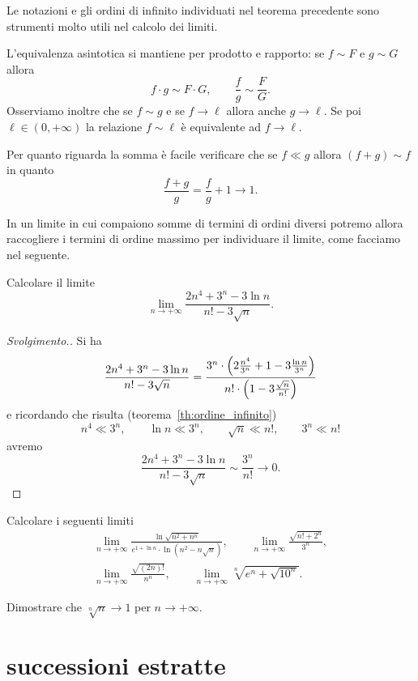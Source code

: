 Le notazioni e gli
ordini di infinito individuati nel teorema precedente
sono strumenti molto utili nel calcolo dei limiti.

L'equivalenza asintotica
si mantiene per prodotto e rapporto:
se $f\sim F$ e $g\sim G$ allora
\[
 f \cdot g \sim F \cdot G,
 \qquad
 \frac{f}{g} \sim \frac{F}{G}.
\]
Osserviamo inoltre che se
$f \sim g$ e se $f\to \ell$ allora
anche $g\to \ell$.
Se poi $\ell\in(0,+\infty)$
la relazione $f\sim \ell$ è equivalente ad $f\to \ell$.

Per quanto riguarda la somma
è facile verificare che se $f\ll g$ allora
$(f+g) \sim f$ in quanto
\[
  \frac{f + g}{g} = \frac{f}{g} + 1 \to 1.
\]

In un limite in cui compaiono somme di termini
di ordini diversi potremo allora raccogliere i termini di ordine
massimo per individuare il limite, come facciamo
nel seguente.

\begin{example}
Calcolare il limite
\[
\lim_{n\to+\infty}
\frac{2n^4 + 3^n - 3 \ln n}{n! - 3\sqrt n}.
\]
\end{example}
\begin{proof}[Svolgimento.]
Si ha
\[
\frac{2n^4 + 3^n - 3 \ln n}{n! - 3\sqrt{n}}
= \frac
{3^n \cdot {\left( 2\frac{n^4}{3^n}+ 1 - 3\frac{\ln n}{3^n} \right)}}
{n!\cdot {\left( 1-3\frac{\sqrt n}{n!} \right)}}
\]
e ricordando che risulta (teorema~\ref{th:ordine_infinito})
\[
n^4 \ll 3^n, \qquad
\ln n \ll 3^n, \qquad
\sqrt n \ll n!, \qquad
3^n \ll n!
\]
avremo
\[
\frac{2n^4 + 3^n - 3 \ln n}{n! - 3\sqrt{n}}
\sim \frac{3^n}{n!} \to 0.
\]
\end{proof}


\begin{exercise}
Calcolare i seguenti limiti
\begin{gather*}
  \lim_{n\to +\infty} \frac{\displaystyle \ln\sqrt{n^2+n^n}}
  {\displaystyle e^{1 + \ln n}\cdot \ln(n^2-n\sqrt n)}, \qquad
  \lim_{n\to +\infty} \frac{\sqrt{n! + 2^n}}{3^n}, \\
  \lim_{n\to +\infty} \frac{\sqrt{(2n)!}}{n^n}, \qquad
  \lim_{n\to +\infty} \sqrt[n]{e^n + \sqrt{10^n}}.
\end{gather*}
\end{exercise}

\begin{exercise}
  Dimostrare che $\sqrt[n]{n}\to 1$ per $n\to +\infty$.
\end{exercise}

\section{successioni estratte}

